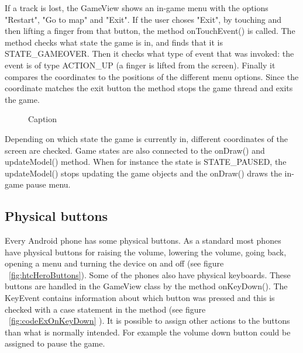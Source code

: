 If a track is lost, the GameView shows an in-game menu with the options "Restart", "Go to map" and "Exit". If the user choses "Exit", by touching and then lifting a finger from that button, the method onTouchEvent() is called. The method checks what state the game is in, and finds that it is STATE\_GAMEOVER. Then it checks what type of event that was invoked: the event is of type ACTION\_UP (a finger is lifted from the screen). Finally it compares the coordinates to the positions of the different menu options. Since the coordinate matches the exit button the method stops the game thread and exits the game.

\begin{figure}[htb]
\begin{small}

\end{small}
\caption{Caption}
\label{fig:codeExBackToMenuButtonPressed}
\end{figure}

Depending on which state the game is currently in, different coordinates of the screen are checked. Game states are also connected to the onDraw() and updateModel() method. When for instance the state is STATE\_PAUSED, the updateModel() stops updating the game objects and the onDraw() draws the in-game pause menu.

\subsection{Physical buttons}

Every Android phone has some physical buttons. As a standard most phones have physical buttons for raising the volume, lowering the volume, going back, opening a menu and turning the device on and off (see figure ~\ref{fig:htcHeroButtons}). Some of the phones also have physical keyboards. These buttons are handled in the GameView class by the method onKeyDown(). The KeyEvent contains information about which button was pressed and this is checked with a case statement in the method (see figure ~\ref{fig:codeExOnKeyDown} ). It is possible to assign other actions to the buttons than what is normally intended. For example the volume down button could be assigned to pause the game.

